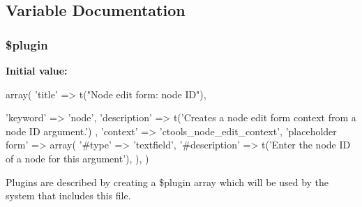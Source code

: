 \subsection{Variable Documentation}
\hypertarget{plugins_2arguments_2node__edit_8inc_ada8a7130088351710bb02ed622d6bf65}{
\subsubsection[{\$plugin}]{\setlength{\rightskip}{0pt plus 5cm}\$plugin}}
\label{plugins_2arguments_2node__edit_8inc_ada8a7130088351710bb02ed622d6bf65}
{\bfseries Initial value:}
\begin{DoxyCode}
 array(
  'title' => t("Node edit form: node ID"),
  
  'keyword' => 'node',
  'description' => t('Creates a node edit form context from a node ID argument.')
      ,
  'context' => 'ctools_node_edit_context',
  'placeholder form' => array(
    '#type' => 'textfield',
    '#description' => t('Enter the node ID of a node for this argument'),
  ),
)
\end{DoxyCode}
Plugins are described by creating a \$plugin array which will be used by the system that includes this file. 